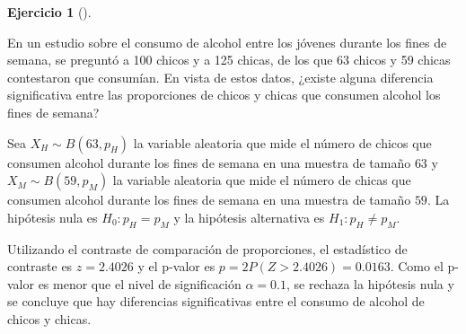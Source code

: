 \documentclass[
  a4paper,
]{scrreport}
\theoremstyle{definition}
\newtheorem{exercise}{Ejercicio}[chapter]
\theoremstyle{remark}
\begin{document}
\begin{exercise}[]\protect\hypertarget{exr-contraste-proporcion-consumo-alcohol}{}\label{exr-contraste-proporcion-consumo-alcohol}

En un estudio sobre el consumo de alcohol entre los jóvenes durante los
fines de semana, se preguntó a 100 chicos y a 125 chicas, de los que 63
chicos y 59 chicas contestaron que consumían. En vista de estos datos,
¿existe alguna diferencia significativa entre las proporciones de chicos
y chicas que consumen alcohol los fines de semana?

\begin{tcolorbox}[enhanced jigsaw, colframe=quarto-callout-tip-color-frame, breakable, opacityback=0, titlerule=0mm, opacitybacktitle=0.6, bottomtitle=1mm, toptitle=1mm, colback=white, leftrule=.75mm, colbacktitle=quarto-callout-tip-color!10!white, arc=.35mm, rightrule=.15mm, left=2mm, bottomrule=.15mm, toprule=.15mm, title=\textcolor{quarto-callout-tip-color}{\faLightbulb}\hspace{0.5em}{Solución}, coltitle=black]

Sea \(X_H\sim B(63,p_H)\) la variable aleatoria que mide el número de
chicos que consumen alcohol durante los fines de semana en una muestra
de tamaño \(63\) y \(X_M\sim B(59,p_M)\) la variable aleatoria que mide
el número de chicas que consumen alcohol durante los fines de semana en
una muestra de tamaño \(59\). La hipótesis nula es \(H_0: p_H=p_M\) y la
hipótesis alternativa es \(H_1: p_H\neq p_M\).

Utilizando el contraste de comparación de proporciones, el estadístico
de contraste es \(z=2.4026\) y el p-valor es
\(p =2 P(Z>2.4026) = 0.0163\). Como el p-valor es menor que el nivel de
significación \(\alpha = 0.1\), se rechaza la hipótesis nula y se
concluye que hay diferencias significativas entre el consumo de alcohol
de chicos y chicas.

\end{tcolorbox}

\end{exercise}
\end{document}
